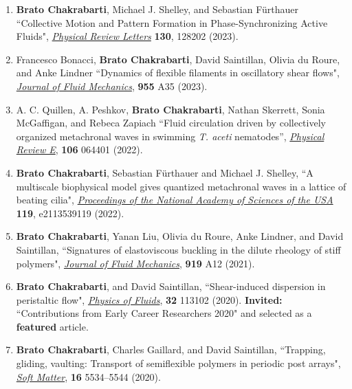 \documentclass[10pt]{res} %
\begin{document}
\begin{resume}
\begin{enumerate}[topsep=0pt,itemsep= 1ex]
\item  \textbf{Brato Chakrabarti}, Michael J. Shelley, and  Sebastian F\"{u}rthauer ``Collective Motion and Pattern Formation in Phase-Synchronizing Active Fluids", \href{https://doi.org/10.1103/PhysRevLett.130.128202}{\textit{Physical Review Letters}} \textbf{130}, 128202 (2023).

\item Francesco Bonacci, \textbf{Brato Chakrabarti}, David Saintillan, Olivia du Roure, and Anke Lindner ``Dynamics of flexible filaments in oscillatory shear flows", \href{https://doi.org/10.1017/jfm.2022.1040}{\textit{Journal of Fluid Mechanics}},  \textbf{955} A35 (2023).

\item  A. C. Quillen, A. Peshkov, \textbf{Brato Chakrabarti}, Nathan Skerrett, Sonia McGaffigan, and Rebeca Zapiach ``Fluid circulation driven by collectively organized metachronal waves in swimming \textit{T. aceti} nematodes'',  \href{https://doi.org/10.1103/PhysRevE.106.064401}{\textit{Physical Review E}}, \textbf{106} 064401 (2022).  

\item \textbf{Brato Chakrabarti}, Sebastian F\"{u}rthauer and Michael J. Shelley, ``A multiscale biophysical model gives quantized metachronal waves in a lattice of beating cilia",   \href{https://doi.org/10.1073/pnas.2113539119}{\textit{Proceedings of the National Academy of Sciences of the USA}} \textbf{119}, e2113539119 (2022). 

\item \textbf{Brato Chakrabarti}, Yanan Liu, Olivia du Roure, Anke Lindner, and David Saintillan, ``Signatures of elastoviscous buckling in the dilute rheology of stiff polymers",  \href{https://doi.org/10.1017/jfm.2021.383}{\textit{Journal of Fluid Mechanics}},  \textbf{919} A12 (2021).

\item \textbf{Brato Chakrabarti}, and David Saintillan, ``Shear-induced dispersion in peristaltic flow", \href{https://doi.org/10.1063/5.0030569}{\textit{Physics of Fluids}}, \textbf{32} 113102 (2020).  \textbf{Invited:} ``Contributions from Early Career Researchers 2020" and selected as a \textbf{featured} article.

\item \textbf{Brato Chakrabarti}, Charles Gaillard, and David Saintillan, ``Trapping, gliding, vaulting: Transport of semiflexible polymers in periodic post arrays", \href{https://doi.org/10.1039/D0SM00390E}{\textit{Soft Matter}}, \textbf{16} 5534--5544 (2020).



\end{enumerate}
\end{resume}
\end{document}
